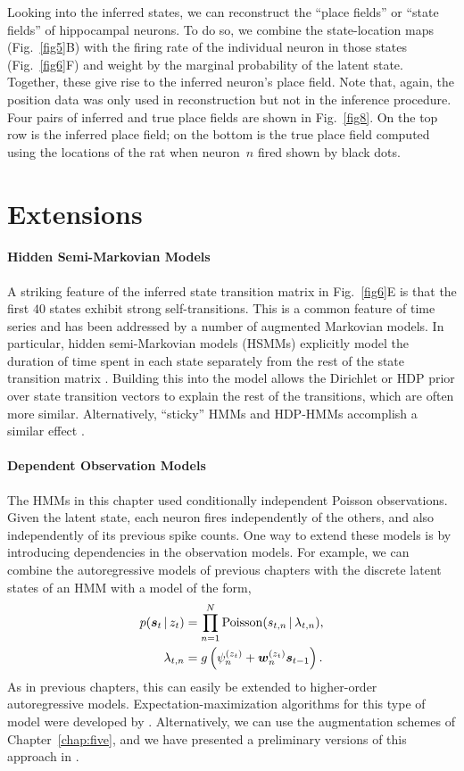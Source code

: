 Looking into the inferred states, we can reconstruct the ``place
fields'' or ``state fields'' of hippocampal neurons. To do so, we
combine the state-location maps (Fig.~\ref{fig5}B) with the firing
rate of the individual neuron in those states (Fig.~\ref{fig6}F) and
weight by the marginal probability of the latent state. Together,
these give rise to the inferred neuron's place field. Note that,
again, the position data was only used in reconstruction but not in
the inference procedure. Four pairs of inferred and true place fields
are shown in Fig.~\ref{fig8}. On the top row is the inferred place
field; on the bottom is the true place field computed using the
locations of the rat when neuron~$n$ fired shown by black dots.


\section{Extensions}

\paragraph{Hidden Semi-Markovian Models}
A striking feature of the inferred state transition matrix in
Fig.~\ref{fig6}E is that the first $40$ states exhibit strong
self-transitions. This is a common feature of time series and has been
addressed by a number of augmented Markovian models. In particular,
hidden semi-Markovian models (HSMMs) explicitly model the duration of
time spent in each state separately from the rest of the state
transition matrix \citep{Johnson13}. Building this into the model
allows the Dirichlet or HDP prior over state transition vectors to
explain the rest of the transitions, which are often more
similar. Alternatively, ``sticky'' HMMs and HDP-HMMs accomplish a
similar effect \citep{Fox08}.


\paragraph{Dependent Observation Models}
The HMMs in this chapter used conditionally independent Poisson 
observations. Given the latent state, each neuron fires independently 
of the others, and also independently of its previous spike counts.
One way to extend these models is by introducing dependencies in 
the observation models. For example, we can combine the autoregressive
models of previous chapters with the discrete latent states of an 
HMM with a model of the form,
\begin{align*}
  p(\boldsymbol{s}_t \,|\, z_t) &= \prod_{n=1}^N \mathrm{Poisson}(s_{t,n} \,|\, \lambda_{t,n}), \\
  \lambda_{t,n} &= g \left(\psi_n^{(z_t)} + \boldsymbol{w}_n^{(z_t)} \boldsymbol{s}_{t-1} \right).
\end{align*}
As in previous chapters, this can easily be extended to higher-order 
autoregressive models. 
Expectation-maximization algorithms for this type of model were developed 
by \citet{escola2011hidden}.
Alternatively, we can use the \polyagamma
augmentation schemes of Chapter~\ref{chap:five}, and we have presented
a preliminary versions of this approach in \citet{johnson2015cosyne}.



